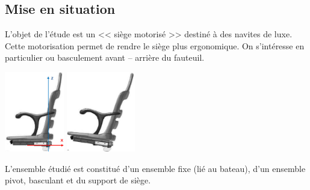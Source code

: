 \documentclass[10pt,fleqn]{article} %
\begin{document}

\vspace{5.5cm}
\pagestyle{fancy}
\thispagestyle{plain}


\def\columnseprulecolor{\color{ocre}}
\setlength{\columnseprule}{0.4pt} 

\begin{multicols}{2}
\section*{Mise en situation}
\ifprof
\else
\fi

L'objet de l'étude est un << siège motorisé >> destiné à des navites de luxe. Cette motorisation permet de rendre le siège plus ergonomique. On s'intéresse en particulier ou basculement avant -- arrière du fauteuil.

\begin{center}
\includegraphics[height=3.5cm]{images/fig_02}
\hspace{1cm}
\includegraphics[height=3.5cm]{images/fig_03}
\end{center}

L'ensemble étudié est constitué d'un ensemble fixe (lié au bateau), d'un ensemble pivot, basculant et du support de siège.


\end{multicols}
\end{document}
